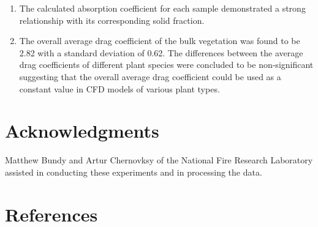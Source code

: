 \documentclass[12pt]{article}
\begin{document}
\begin{enumerate}
  \item The calculated absorption coefficient for each sample demonstrated a strong relationship with its corresponding solid fraction.
  \item The overall average drag coefficient of the bulk vegetation was found to be 2.82 with a standard deviation of 0.62. The differences between the average drag coefficients of different plant species were concluded to be non-significant suggesting that the overall average drag coefficient could be used as a constant value in CFD models of various plant types.
\end{enumerate}

\section*{Acknowledgments}

\noindent Matthew Bundy and Artur Chernovksy of the National Fire Research Laboratory assisted in conducting these experiments and in processing the data.   \\
\pagebreak
\section*{References}



\end{document}
